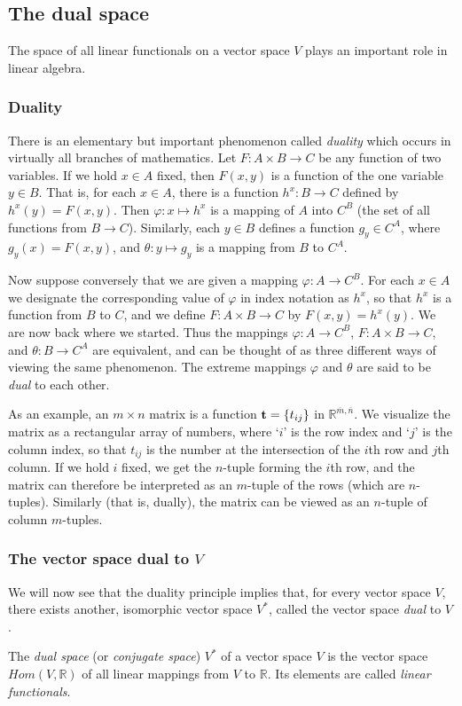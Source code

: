 \documentclass[12pt,letterpaper,reqno]{article}
\numberwithin{equation}{section}
\newcommand{\ti}[1]{\textit{#1}}
\begin{document}
\subsection{The dual space}
The space of all linear functionals on a vector space $V$ plays an important role in linear algebra.

\subsubsection{Duality}
There is an elementary but important phenomenon called \ti{duality} which occurs in virtually all branches of mathematics. Let $F: A \times B \to C$ be any function of two variables. If we hold $x \in A$ fixed, then $F(x,y)$ is a function of the one variable $y \in B$. That is, for each $x \in A$, there is a function $h^x:B \to C$ defined by $h^x(y)=F(x,y)$. Then $\varphi:x \mapsto h^x$ is a mapping of $A$ into $C^B$ (the set of all functions from $B \to C$). Similarly, each $y \in B$ defines a function $g_y \in C^A$, where $g_y(x)=F(x,y)$, and $\theta:y \mapsto g_y$ is a mapping from $B$ to $C^A$.

Now suppose conversely that we are given a mapping $\varphi:A \to C^B$. For each $x \in A$ we designate the corresponding value of $\varphi$ in index notation as $h^x$, so that $h^x$ is a function from $B$ to $C$, and we define $F:A \times B \to C$ by $F(x,y)=h^x(y)$. We are now back where we started. Thus the mappings $\varphi:A \to C^B$, $F:A \times B \to C$, and $\theta:B \to C^A$ are equivalent, and can be thought of as three different ways of viewing the same phenomenon. The extreme mappings $\varphi$ and $\theta$ are said to be \ti{dual} to each other.

As an example, an $m \times n$ matrix is a function ${\bf t}=\{t_{ij}\}$ in $\mathbb{R}^{\overline{m},\overline{n}}$. We visualize the matrix as a rectangular array of numbers, where `$i$' is the row index and `$j$' is the column index, so that $t_{ij}$ is the number at the intersection of the $i$th row and $j$th column. If we hold $i$ fixed, we get the $n$-tuple forming the $i$th row, and the matrix can therefore be interpreted as an $m$-tuple of the rows (which are $n$-tuples). Similarly (that is, dually), the matrix can be viewed as an $n$-tuple of column $m$-tuples.

\subsubsection{The vector space dual to $V$}
We will now see that the duality principle implies that, for every vector space $V$, there exists another, isomorphic vector space $V^*$, called the vector space \ti{dual} to $V$.
\begin{defn}
The \ti{dual space} (or \ti{conjugate space}) $V^*$ of a vector space $V$ is the vector space $Hom(V,\mathbb{R})$ of all linear mappings from $V$ to $\mathbb{R}$. Its elements are called \ti{linear functionals}.
\end{defn}
\end{document}
